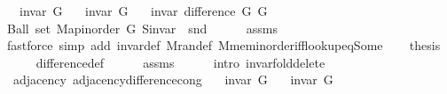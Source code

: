 \begin{isabellebody}
\ \ \ {\isachardoublequoteopen}invar\ G{}{\isachardoublequoteclose}\isanewline
\ \ \ {\isachardoublequoteopen}invar\ G{}{\isachardoublequoteclose}\isanewline
\ \ \ {\isachardoublequoteopen}invar\ {\isacharparenleft}{\kern0pt}difference\ G{}\ G{}{\isacharparenright}{\kern0pt}{\isachardoublequoteclose}\isanewline
%
\isadelimproof
%
\endisadelimproof
%
\isatagproof
{}\isamarkupfalse%
\ {\isacharminus}{\kern0pt}\isanewline
\ \ \isamarkupfalse%
\ {\isachardoublequoteopen}Ball\ {\isacharparenleft}{\kern0pt}set\ {\isacharparenleft}{\kern0pt}Map{\isacharunderscore}{\kern0pt}inorder\ G{}{\isacharparenright}{\kern0pt}{\isacharparenright}{\kern0pt}\ {\isacharparenleft}{\kern0pt}S{\isachardot}{\kern0pt}invar\ {\isasymcirc}\ snd{\isacharparenright}{\kern0pt}{\isachardoublequoteclose}\isanewline
\ \ \ \ \isamarkupfalse%
\ assms{\isacharparenleft}{\kern0pt}{}{\isacharparenright}{\kern0pt}\isanewline
\ \ \ \ \isamarkupfalse%
\ {\isacharparenleft}{\kern0pt}fastforce\ simp\ add{\isacharcolon}{\kern0pt}\ invar{\isacharunderscore}{\kern0pt}def\ M{\isachardot}{\kern0pt}ran{\isacharunderscore}{\kern0pt}def\ M{\isachardot}{\kern0pt}mem{\isacharunderscore}{\kern0pt}inorder{\isacharunderscore}{\kern0pt}iff{\isacharunderscore}{\kern0pt}lookup{\isacharunderscore}{\kern0pt}eq{\isacharunderscore}{\kern0pt}Some{\isacharparenright}{\kern0pt}\isanewline
\ \ \isamarkupfalse%
\ {\isacharquery}{\kern0pt}thesis\isanewline
\ \ \ \ \isamarkupfalse%
\ difference{\isacharunderscore}{\kern0pt}def\isanewline
\ \ \ \ \isamarkupfalse%
\ assms{\isacharparenleft}{\kern0pt}{}{\isacharparenright}{\kern0pt}\isanewline
\ \ \ \ \isamarkupfalse%
\ {\isacharparenleft}{\kern0pt}intro\ invar{\isacharunderscore}{\kern0pt}fold{\isacharunderscore}{\kern0pt}delete{\isacharunderscore}{\kern0pt}{}{\isacharparenright}{\kern0pt}\isanewline
{}\isamarkupfalse%
%
\endisatagproof
{\isafoldproof}%
%
\isadelimproof
\isanewline
%
\endisadelimproof
\isanewline
{}\isamarkupfalse%
\ {\isacharparenleft}{\kern0pt}\ adjacency{\isacharparenright}{\kern0pt}\ adjacency{\isacharunderscore}{\kern0pt}difference{\isacharunderscore}{\kern0pt}cong{\isacharcolon}{\kern0pt}\isanewline
\ \ \ {\isachardoublequoteopen}invar\ G{}{\isachardoublequoteclose}\isanewline
\ \ \ {\isachardoublequoteopen}invar\ G{}{\isachardoublequoteclose}\isanewline

\end{isabellebody}
